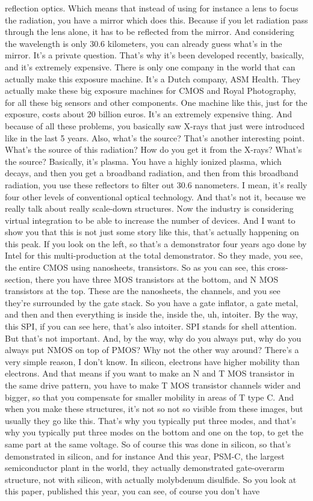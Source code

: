 reflection optics. Which means that instead of using for instance a lens to focus the radiation, you have a mirror which does this. Because if you let radiation pass through the lens alone, it has to be reflected from the mirror. And considering the wavelength is only 30.6 kilometers, you can already guess what's in the mirror. It's a private question. That's why it's been developed recently, basically, and it's extremely expensive. There is only one company in the world that can actually make this exposure machine. It's a Dutch company, ASM Health. They actually make these big exposure machines for CMOS and Royal Photography, for all these big sensors and other components. One machine like this, just for the exposure, costs about 20 billion euros. It's an extremely expensive thing. And because of all these problems, you basically saw X-rays that just were introduced like in the last 5 years. Also, what's the source? That's another interesting point. What's the source of this radiation? How do you get it from the X-rays? What's the source? Basically, it's plasma. You have a highly ionized plasma, which decays, and then you get a broadband radiation, and then from this broadband radiation, you use these reflectors to filter out 30.6 nanometers. I mean, it's really four other levels of conventional optical technology. And that's not it, because we really talk about really scale-down structures. Now the industry is considering virtual integration to be able to increase the number of devices. And I want to show you that this is not just some story like this, that's actually happening on this peak. If you look on the left, so that's a demonstrator four years ago done by Intel for this multi-production at the total demonstrator. So they made, you see, the entire CMOS using nanosheets, transistors. So as you can see, this cross-section, there you have three MOS transistors at the bottom, and N MOS transistors at the top. These are the nanosheets, the channels, and you see they're surrounded by the gate stack. So you have a gate inflator, a gate metal, and then and then everything is inside the, inside the, uh, intoiter. By the way, this SPI, if you can see here, that's also intoiter. SPI stands for shell attention. But that's not important. And, by the way, why do you always put, why do you always put NMOS on top of PMOS? Why not the other way around? There's a very simple reason, I don't know. In silicon, electrons have higher mobility than electrons. And that means if you want to make an N and T MOS transistor in the same drive pattern, you have to make T MOS transistor channels wider and bigger, so that you compensate for smaller mobility in areas of T type C. And when you make these structures, it's not so not so visible from these images, but usually they go like this. That's why you typically put three modes, and that's why you typically put three modes on the bottom and one on the top, to get the same part at the same voltage. So of course this was done in silicon, so that's demonstrated in silicon, and for instance And this year, PSM-C, the largest semiconductor plant in the world, they actually demonstrated gate-overarm structure, not with silicon, with actually molybdenum disulfide. So you look at this paper, published this year, you can see, of course you don't have 